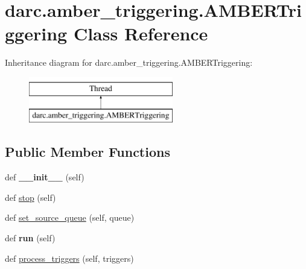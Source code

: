 \hypertarget{classdarc_1_1amber__triggering_1_1_a_m_b_e_r_triggering}{}\section{darc.\+amber\+\_\+triggering.\+A\+M\+B\+E\+R\+Triggering Class Reference}
\label{classdarc_1_1amber__triggering_1_1_a_m_b_e_r_triggering}
Inheritance diagram for darc.\+amber\+\_\+triggering.\+A\+M\+B\+E\+R\+Triggering\+:\begin{figure}[H]
\begin{center}
\leavevmode
\includegraphics[height=2.000000cm]{classdarc_1_1amber__triggering_1_1_a_m_b_e_r_triggering}
\end{center}
\end{figure}
\subsection*{Public Member Functions}
\begin{DoxyCompactItemize}
\item 
\mbox{\label{classdarc_1_1amber__triggering_1_1_a_m_b_e_r_triggering_a53c4cc1e433e97fe7279bd6e209cba0e}} 
def {\bfseries \+\_\+\+\_\+init\+\_\+\+\_\+} (self)
\item 
def \mbox{\hyperlink{classdarc_1_1amber__triggering_1_1_a_m_b_e_r_triggering_a1a48ae041a381ce2a5adb7e5d5885ccd}{stop}} (self)
\item 
def \mbox{\hyperlink{classdarc_1_1amber__triggering_1_1_a_m_b_e_r_triggering_a645bbe2b862d0e1818d260d1111b7eb6}{set\+\_\+source\+\_\+queue}} (self, queue)
\item 
\mbox{\label{classdarc_1_1amber__triggering_1_1_a_m_b_e_r_triggering_a3dedf1505c240eb42b1ec887dda255b9}} 
def {\bfseries run} (self)
\item 
def \mbox{\hyperlink{classdarc_1_1amber__triggering_1_1_a_m_b_e_r_triggering_a3f2d8d1a8da7fad98b6ef115397aab79}{process\+\_\+triggers}} (self, triggers)
\end{DoxyCompactItemize}
